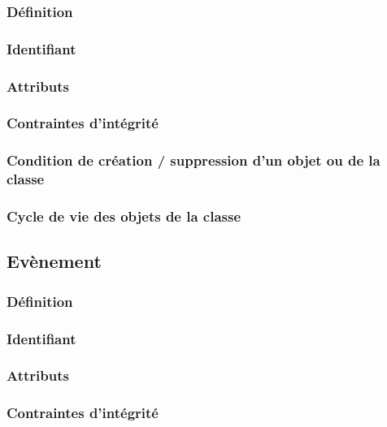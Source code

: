 \documentclass[a4paper, 11pt]{report}
\begin{document}
\subsubsection{Définition}

\subsubsection{Identifiant}

\subsubsection{Attributs}

\subsubsection{Contraintes d'intégrité}

\subsubsection{Condition de création / suppression d'un objet ou de la classe}

\subsubsection{Cycle de vie des objets de la classe}

\subsection{Evènement}

\subsubsection{Définition}

\subsubsection{Identifiant}

\subsubsection{Attributs}

\subsubsection{Contraintes d'intégrité}
\end{document}
